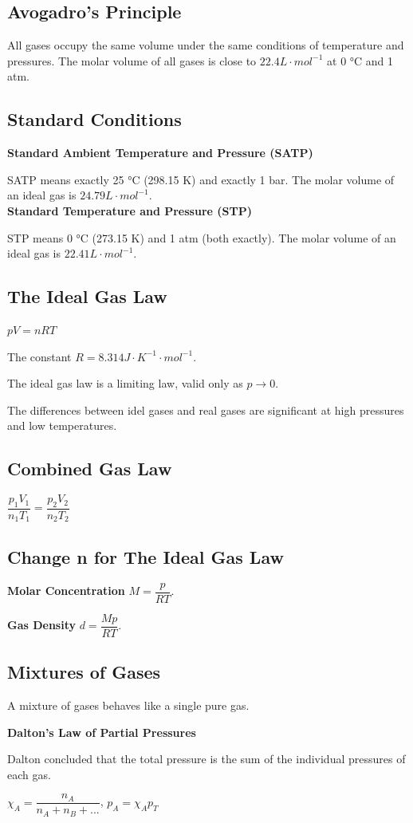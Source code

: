 \documentclass[a4paper,12pt]{article}
\begin{document}
\subsection{Avogadro's Principle}
All gases occupy the same volume under the same conditions of temperature
and pressures. The molar volume of all gases is close to $22.4 L\cdot mol^{-1}$ at 0 °C and 1 atm.
\subsection{Standard Conditions}
\noindent\textbf{Standard Ambient Temperature and Pressure (SATP)}\par SATP means exactly 25 °C (298.15 K) and exactly 1 bar. The molar volume of an ideal gas is $24.79 L\cdot mol^{-1}$.\\
\noindent\textbf{Standard Temperature and Pressure (STP)}\par STP means 0 °C (273.15 K) and 1 atm (both exactly).
The molar volume of an ideal gas is $22.41 L\cdot mol^{-1}$.
\subsection{The Ideal Gas Law}
\begin{center}
$pV=nRT$
\end{center}\par
The constant $R = 8.314 J\cdot K^{-1}\cdot mol^{-1}$.\par
The ideal gas law is a limiting law, valid only as $p\rightarrow0$.\par
The differences between idel gases and real gases are significant at high pressures and low temperatures.
\subsection{Combined Gas Law}
\begin{center}
$\dfrac{p_{1}V_{1}}{n_{1}T_{1}}=\dfrac{p_{2}V_{2}}{n_{2}T_{2}}$
\end{center}
\subsection{Change n for The Ideal Gas Law}
\textbf{Molar Concentration} $M=\dfrac{p}{RT}$.\par
\textbf{Gas Density} $d=\dfrac{Mp}{RT}$.
\subsection{Mixtures of Gases}
A mixture of gases behaves like a single pure gas.\par
\textbf{Dalton's Law of Partial Pressures}\par
Dalton concluded that the total pressure is the sum of the individual pressures of each gas.
\begin{center}
$\chi_{A}=\dfrac{n_{A}}{n_{A}+n_{B}+...}$, $p_{A}=\chi_{A}p_{T}$
\end{center}
\end{document}
